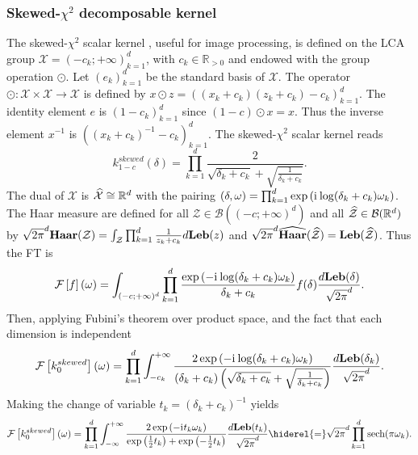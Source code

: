 \documentclass[twoside,11pt]{article}
\begin{document}
\subsubsection{Skewed-$\chi^2$ decomposable kernel}
\label{subsubsec:skewedchi2} The skewed-$\chi^2$ scalar kernel
\citep{li2010random}, useful for image processing, is defined on the \acs{LCA}
group $\mathcal{X}=(-c_k;+\infty)_{k=1}^d$, with $c_k\in\mathbb{R}_{>0}$ and
endowed with the group operation $\odot$. Let $(e_k)_{k=1}^d$ be the standard
basis of $\mathcal{X}$. The operator $\odot:
\mathcal{X}\times\mathcal{X}\to\mathcal{X}$ is defined by $x\odot z =
\left((x_k + c_k)(z_k + c_k) - c_k\right)_{k=1}^d$.  The identity element $e$
is $\left(1-c_k\right)_{k=1}^d$ since $(1-c) \odot x = x$. Thus the inverse
element $x^{-1}$ is $((x_k+c_k)^{-1} - c_k)_{k=1}^d$. The skewed-$\chi^2$
scalar kernel reads
\begin{dmath}
    k^{skewed}_{1-c}(\delta)
    =\prod_{k=1}^d\frac{2}{\sqrt{\delta_k+c_k}+\sqrt{\frac{1}{\delta_k+c_k}}}.
\end{dmath}
The dual of $\mathcal{X}$ is $\widehat{\mathcal{X}}\cong\mathbb{R}^d$ with the
pairing $(\delta,\omega)
=\prod_{k=1}^d\exp\left({\mathrm{i}\mkern1mu}\log(\delta_k+c_k)\omega_k\right)$.  The Haar
measure are defined for all $\mathcal{Z}\in\mathcal{B}((-c;+\infty)^d)$ and all
$\widehat{\mathcal{Z}}\in\mathcal{B}(\mathbb{R}^d)$ by
$\sqrt{2\pi}^d\mathbf{Haar}(\mathcal{Z})
=\int_{\mathcal{Z}}\prod_{k=1}^d\frac{1}{z_k+c_k}d\mathbf{Leb}(z)$ and
$\sqrt{2\pi}^d\widehat{\mathbf{Haar}}(\widehat{\mathcal{Z}})=\mathbf{Leb}(\widehat{\mathcal{Z}})$. Thus
the \acl{FT} is
\begin{dmath*}
    \FT{f}(\omega)
    =\int_{(-c;+\infty)^d}\prod_{k=1}^d\frac{\exp\left(-\iu
    \log(\delta_k+c_k)\omega_k\right)}{\delta_k +
    c_k}f(\delta)\frac{d\Leb(\delta)}{\sqrt{2\pi}^d}.
\end{dmath*}
Then, applying Fubini's theorem over product space, and the fact that each
dimension is independent
\begin{dmath*}
    \FT{k_0^{skewed}}(\omega)
    =\prod_{k=1}^d\int_{-c_k}^{+\infty}\frac{2\exp\left(-\iu
    \log(\delta_k+c_k)\omega_k\right)}{(\delta_k +
    c_k)\left(\sqrt{\delta_k + c_k} + \sqrt{\frac{1}{\delta_k + c_k}}\right)}
    \frac{d\Leb(\delta_k)}{\sqrt{2\pi}^d}.
\end{dmath*}
Making the change of variable $t_k=(\delta_k+c_k)^{-1}$ yields
\begin{dmath*}
    \FT{k_0^{skewed}}(\omega)
    = \prod_{k=1}^d\int_{-\infty}^{+\infty} \frac{2 \exp\left(-\iu t_k
    \omega_k\right)}{\exp\left(\frac{1}{2} t_k \right) + \exp\left(-\frac{1}{2}
    t_k \right)} \frac{d\Leb(t_k)}{\sqrt{2\pi}^d}
    \hiderel{=}\sqrt{2\pi}^d\prod_{k=1}^d\sech(\pi\omega_k).
\end{dmath*}
\end{document}
